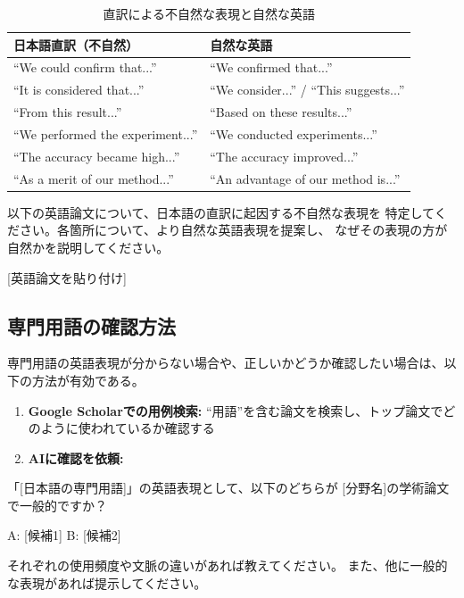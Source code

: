 \begin{table}[htbp]
\centering
\caption{直訳による不自然な表現と自然な英語}
\label{tab:unnatural}
\footnotesize
\begin{tabular}{ll}
\toprule
日本語直訳（不自然） & 自然な英語 \\
\midrule
``We could confirm that...'' & ``We confirmed that...'' \\
``It is considered that...'' & ``We consider...'' / ``This suggests...'' \\
``From this result...'' & ``Based on these results...'' \\
``We performed the experiment...'' & ``We conducted experiments...'' \\
``The accuracy became high...'' & ``The accuracy improved...'' \\
``As a merit of our method...'' & ``An advantage of our method is...'' \\
\bottomrule
\end{tabular}
\end{table}

\begin{promptbox}
以下の英語論文について、日本語の直訳に起因する不自然な表現を
特定してください。各箇所について、より自然な英語表現を提案し、
なぜその表現の方が自然かを説明してください。

{[}英語論文を貼り付け]
\end{promptbox}

\subsection{専門用語の確認方法}

専門用語の英語表現が分からない場合や、正しいかどうか確認したい場合は、以下の方法が有効である。

\begin{enumerate}
\item \textbf{Google Scholarでの用例検索:} ``用語''を含む論文を検索し、トップ論文でどのように使われているか確認する
\item \textbf{AIに確認を依頼:}
\end{enumerate}

\begin{promptbox}
「[日本語の専門用語]」の英語表現として、以下のどちらが
{[}分野名]の学術論文で一般的ですか？

A: [候補1]
B: [候補2]

それぞれの使用頻度や文脈の違いがあれば教えてください。
また、他に一般的な表現があれば提示してください。
\end{promptbox}

